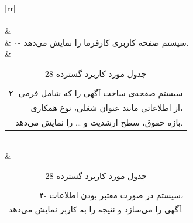 \documentclass[12pt]{article}
\begin{document}
\begin{center}
		\begin{table}[H]
			\caption{جدول مورد کاربرد گسترده 28}
			\label{tab:ext-uc28}
			\begin{tabular}{|rr|}
				\hline
				\rowcolor{Gainsboro!60}
				                                                                                                                                                                                                                                                 \\ \hline
				                                                                                                                                                                                                                                   \\ \hline
				                                                                                          &                                                                                                                              \\ \hline
				                                                                                                        & ۰- سیستم صفحه کاربری کارفرما را نمایش می‌دهد.                                                                                                                                \\ \hline
				 & \begin{tabular}[c]{@{}r@{}}۲- سیستم صفحه‌ی ساخت آگهی را که شامل فرمی \\ از اطلاعاتی مانند عنوان شغلی، نوع همکاری، \\ بازه حقوق، سطح ارشدیت و … را نمایش می‌دهد.\end{tabular} \\ \hline
				 & \begin{tabular}[c]{@{}r@{}}۴- سیستم در صورت معتبر بودن اطلاعات، \\ آگهی را می‌سازد و نتیجه را به کاربر نمایش می‌دهد.\end{tabular}                                            \\ \hline

\end{tabular}
\end{table}
\end{center}
\end{document}
